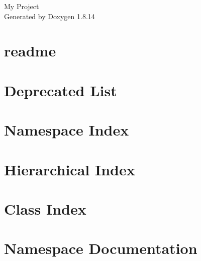 \documentclass[twoside]{book}
\newcommand{\+}{\discretionary{\mbox{\scriptsize$\hookleftarrow$}}{}{}}
\newcommand{\clearemptydoublepage}{%
  \newpage{\pagestyle{empty}\cleardoublepage}%
}
\begin{document}
\hypersetup{pageanchor=false,
             bookmarksnumbered=true,
             pdfencoding=unicode
            }
\begin{titlepage}
\vspace*{7cm}
\begin{center}%
{\Large My Project }\\
\vspace*{1cm}
{\large Generated by Doxygen 1.8.14}\\
\end{center}
\end{titlepage}
\clearemptydoublepage
{}
\tableofcontents
\clearemptydoublepage
{}
\hypersetup{pageanchor=true}

\chapter{readme}
\label{md_readme}

\chapter{Deprecated List}
\label{deprecated}

\chapter{Namespace Index}

\chapter{Hierarchical Index}

\chapter{Class Index}

\chapter{Namespace Documentation}

\end{document}
